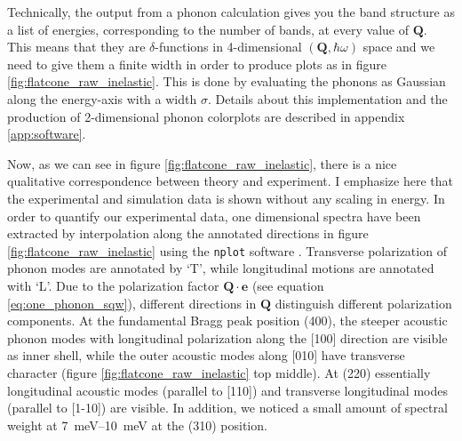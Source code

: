 Technically, the output from a phonon calculation gives you the band structure as a list of energies, corresponding to the number of bands, at every value of $\bm{Q}$. This means that they are $\delta$-functions in 4-dimensional $(\bm{Q},\hbar\omega)$ space and we need to give them a finite width in order to produce plots as in figure \ref{fig:flatcone_raw_inelastic}. This is done by evaluating the phonons as Gaussian along the energy-axis with a width $\sigma$. Details about this implementation and the production of 2-dimensional phonon colorplots are described in appendix \ref{app:software}.

Now, as we can see in figure \ref{fig:flatcone_raw_inelastic}, there is a nice qualitative correspondence between theory and experiment. I emphasize here that the experimental and simulation data is shown without any scaling in energy. In order to quantify our experimental data, one dimensional spectra have been extracted by interpolation along the annotated directions in figure \ref{fig:flatcone_raw_inelastic} using the \texttt{nplot} software \cite{nplot}. Transverse polarization of phonon modes are annotated by `T', while longitudinal motions are annotated with `L'. Due to the polarization factor $\bm{Q} \cdot \bm{e}$ (see equation \eqref{eq:one_phonon_sqw}), different directions in $\bm{Q}$ distinguish different polarization components. At the fundamental Bragg peak position (400), the steeper acoustic phonon modes with longitudinal polarization along the [100] direction are visible as inner shell, while the outer acoustic modes along [010] have transverse character (figure \ref{fig:flatcone_raw_inelastic} top middle). At (220) essentially longitudinal acoustic modes (parallel to [110]) and transverse longitudinal modes (parallel to [1-10]) are visible. In addition, we noticed a small amount of spectral weight at \SIrange{7}{10}{\milli\eV} at the (310) position.

